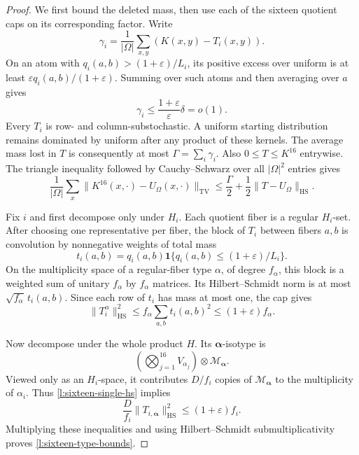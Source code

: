 \begin{proof}
We first bound the deleted mass, then use each of the sixteen quotient
caps on its corresponding factor.  Write
\[
 \gamma_i=\frac1{|\Omega|}\sum_{x,y}(K(x,y)-T_i(x,y)).
\]
On an atom with $q_i(a,b)>(1+\varepsilon)/L_i$, its positive excess
over uniform is at least
$\varepsilon q_i(a,b)/(1+\varepsilon)$.  Summing over such atoms and
then averaging over $a$ gives
\begin{equation}
 \gamma_i\le\frac{1+\varepsilon}{\varepsilon}\delta=o(1).
 \label{l:sixteen-loss}
\end{equation}
Every $T_i$ is row- and column-substochastic.  A uniform starting
distribution remains dominated by uniform after any product of these
kernels.  The average mass lost in $T$ is consequently at most
$\Gamma=\sum_i\gamma_i$.  Also $0\le T\le K^{16}$ entrywise.
The triangle inequality followed by Cauchy--Schwarz over all
$|\Omega|^2$ entries gives
\begin{equation}
 \frac1{|\Omega|}\sum_x
       \|K^{16}(x,\cdot)-U_\Omega(x,\cdot)\|_{\mathrm{TV}}
 \le \frac\Gamma2+\frac12\|T-U_\Omega\|_{\mathrm{HS}}.
 \label{l:sixteen-average-tv}
\end{equation}

Fix $i$ and first decompose only under $H_i$.  Each quotient fiber
is a regular $H_i$-set.  After choosing one representative per fiber,
the block of $T_i$ between fibers $a,b$ is convolution by nonnegative
weights of total mass
\[
 t_i(a,b)=q_i(a,b)
       \mathbf1\{q_i(a,b)\le(1+\varepsilon)/L_i\}.
\]
On the multiplicity space of a regular-fiber type $\alpha$, of degree
$f_\alpha$, this block is a weighted sum of unitary $f_\alpha$ by
$f_\alpha$ matrices.  Its Hilbert--Schmidt norm is at most
$\sqrt{f_\alpha}\,t_i(a,b)$.  Since each row of $t_i$ has mass at
most one, the cap gives
\begin{equation}
 \|T_i^\alpha\|_{\mathrm{HS}}^2
 \le f_\alpha\sum_{a,b}t_i(a,b)^2
 \le(1+\varepsilon)f_\alpha.
 \label{l:sixteen-single-hs}
\end{equation}

Now decompose under the whole product $H$.  Its
$\boldsymbol\alpha$-isotype is
\[
 \left(\bigotimes_{j=1}^{16}V_{\alpha_j}\right)
                  \otimes\mathcal M_{\boldsymbol\alpha}.
\]
Viewed only as an $H_i$-space, it contributes $D/f_i$ copies of
$\mathcal M_{\boldsymbol\alpha}$ to the multiplicity of $\alpha_i$.
Thus \eqref{l:sixteen-single-hs} implies
\[
 \frac D{f_i}\|T_{i,\boldsymbol\alpha}\|_{\mathrm{HS}}^2
 \le(1+\varepsilon)f_i.
\]
Multiplying these inequalities and using Hilbert--Schmidt
submultiplicativity proves \eqref{l:sixteen-type-bounds}.


\end{proof}
